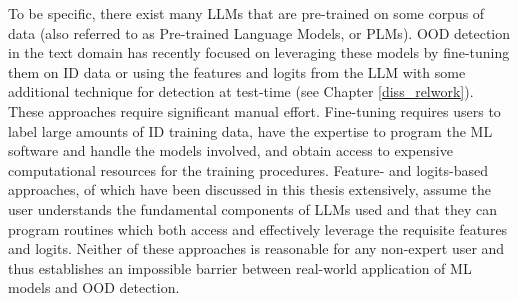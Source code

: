 To be specific, there exist many LLMs that are pre-trained on some corpus of data (also referred to as Pre-trained Language Models, or PLMs). OOD detection in the text domain has recently focused on leveraging these models by fine-tuning them on ID data or using the features and logits from the LLM with some additional technique for detection at test-time (see Chapter \ref{diss_relwork}). These approaches require significant manual effort. Fine-tuning requires users to label large amounts of ID training data, have the expertise to program the ML software and handle the models involved, and obtain access to expensive computational resources for the training procedures. Feature- and logits-based approaches, of which have been discussed in this thesis extensively, assume the user understands the fundamental components of LLMs used and that they can program routines which both access and effectively leverage the requisite features and logits. Neither of these approaches is reasonable for any non-expert user and thus establishes an impossible barrier between real-world application of ML models and OOD detection.

